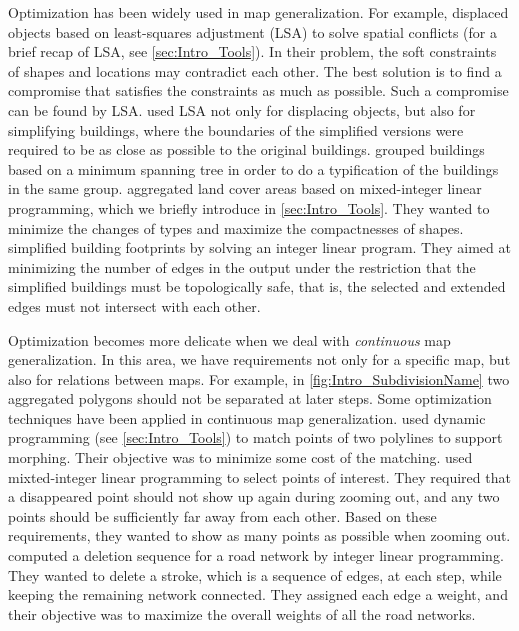 Optimization has been widely used in map generalization.
For example, \textcite{Harrie1999} displaced objects based on 
least-squares adjustment (LSA) to solve spatial conflicts
(for a brief recap of LSA, see \sect\ref{sec:Intro_Tools}).
In their problem, the soft constraints 
of shapes and locations may contradict each other.
The best solution is to find a compromise that satisfies the 
constraints as much as possible. 
Such a compromise can be found by LSA.
\textcite{Sester2005Optimization} used LSA not only for 
displacing objects, but also for simplifying buildings, 
where the boundaries of the simplified versions were required to 
be as close as possible to the original buildings.
\textcite{Regnauld2001} grouped buildings based on 
a minimum spanning tree in order to do a typification of 
the buildings in the same group.
\textcite{HaunertWolff2010AreaAgg} aggregated land cover areas
based on mixed-integer linear programming,
which we briefly introduce in \sect\ref{sec:Intro_Tools}.
They wanted to minimize the changes of types and maximize the 
compactnesses of shapes.
\textcite{Haunertwolff2010Building} simplified building
footprints by solving an integer linear program.
They aimed at minimizing the number of edges in the output under 
the restriction that the simplified buildings must be 
topologically safe,
that is, the selected and extended edges must not intersect with 
each other.



Optimization becomes more delicate
when we deal with \emph{continuous} map generalization.
In this area, we have requirements 
not only for a specific map, 
but also for relations between maps. 
For example, in \fig\ref{fig:Intro_SubdivisionName} two 
aggregated polygons should not be separated at later steps. 
%
Some optimization techniques have been applied in 
continuous map generalization. 
\textcite{Noellenburg2008} used 
dynamic programming (see \sect\ref{sec:Intro_Tools})
to match points of two polylines to support morphing.
Their objective was to minimize some cost of the matching.
\textcite{sahw-oarps-ICAGW13} used mixted-integer linear 
programming to select points of interest.
They required that 
a disappeared point should not show up again during zooming out, 
and any two points should be 
sufficiently far away from each other.
Based on these requirements, they wanted to show as many points 
as possible when zooming out.
\textcite{Chimani2014Eat} computed a deletion sequence
for a road network by integer linear programming.
They wanted to delete a stroke, 
which is a sequence of edges, at each step,
while keeping the remaining network connected.
They assigned each edge a weight, 
and their objective was to maximize the overall weights of all 
the road networks.

